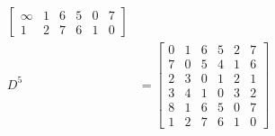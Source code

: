 \documentclass[a4paper,11pt]{article}             %
\begin{document}
\begin{ex}
\begin{exlist}
\begin{align*}
\begin{bmatrix}
\infty & 1 & 6 & 5 & 0 & 7  \\
1 & 2 & 7 & 6 & 1 & 0 
\end{bmatrix} \\
D^{5} &=
\begin{bmatrix}
0 & 1 & 6 & 5 & 2 & 7  \\
7 & 0 & 5 & 4 & 1 & 6  \\
2 & 3 & 0 & 1 & 2 & 1  \\
3 & 4 & 1 & 0 & 3 & 2  \\
8 & 1 & 6 & 5 & 0 & 7  \\
1 & 2 & 7 & 6 & 1 & 0 
\end{bmatrix}\end{align*}
\end{exlist}
\end{ex}
\end{document}
